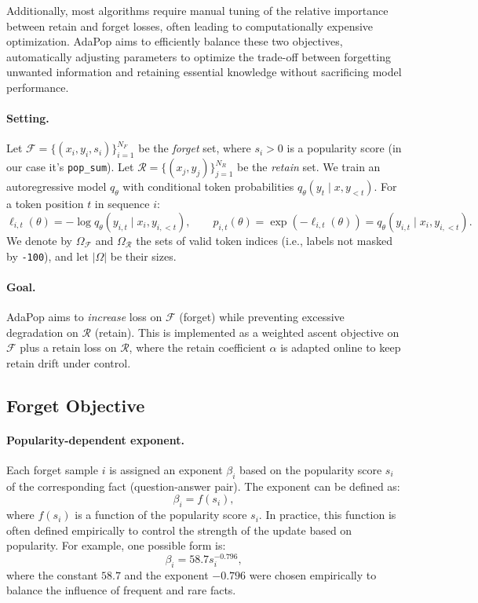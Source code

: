 Additionally, most algorithms require manual tuning of the relative importance between retain and forget losses, often leading to computationally expensive optimization. AdaPop aims to efficiently balance these two objectives, automatically adjusting parameters to optimize the trade-off between forgetting unwanted information and retaining essential knowledge without sacrificing model performance.


\paragraph{Setting.}  
Let $\mathcal{F}=\{(x_i,y_i,s_i)\}_{i=1}^{N_F}$ be the \emph{forget} set, where $s_i>0$ is a popularity score (in our case it's \texttt{pop\_sum}).  
Let $\mathcal{R}=\{(x_j,y_j)\}_{j=1}^{N_R}$ be the \emph{retain} set.  
We train an autoregressive model $q_\theta$ with conditional token probabilities  
$q_\theta(y_t \mid x, y_{<t})$.  
For a token position $t$ in sequence $i$:
\[
\ell_{i,t}(\theta) = -\log q_\theta(y_{i,t} \mid x_i, y_{i,<t}), \qquad p_{i,t}(\theta) = \exp(-\ell_{i,t}(\theta)) = q_\theta(y_{i,t} \mid x_i, y_{i,<t}).
\]
We denote by $\Omega_{\mathcal{F}}$ and $\Omega_{\mathcal{R}}$ the sets of valid token indices (i.e., labels not masked by \texttt{-100}), and let $|\Omega|$ be their sizes.

\paragraph{Goal.}  
AdaPop aims to \emph{increase} loss on $\mathcal{F}$ (forget) while preventing excessive degradation on $\mathcal{R}$ (retain).  
This is implemented as a weighted ascent objective on $\mathcal{F}$ plus a retain loss on $\mathcal{R}$, where the retain coefficient $\alpha$ is adapted online to keep retain drift under control.

\subsection{Forget Objective}

\paragraph{Popularity-dependent exponent.}  
Each forget sample $i$ is assigned an exponent $\beta_i$ based on the popularity score $s_i$ of the corresponding fact (question-answer pair).  
The exponent can be defined as:
\[
\beta_i = f(s_i),
\]
where \( f(s_i) \) is a function of the popularity score \( s_i \). In practice, this function is often defined empirically to control the strength of the update based on popularity. For example, one possible form is:
\[
\beta_i = 58.7 s_i^{-0.796},
\]
where the constant \( 58.7 \) and the exponent \( -0.796 \) were chosen empirically to balance the influence of frequent and rare facts. 

